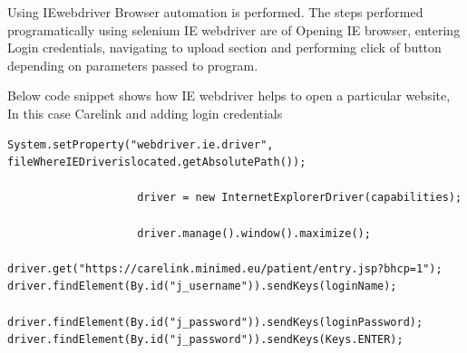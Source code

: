 \documentclass[article,type=msc,colorback,accentcolor=tud9c,twoside,11pt]{tudthesis}
\begin{document}
Using IEwebdriver Browser automation is performed. The steps performed programatically using selenium IE webdriver are of Opening IE browser, entering Login credentials, navigating to upload section and performing click of button depending on parameters passed to program.

Below code snippet shows how IE webdriver helps to open a particular website, In this case Carelink and adding login credentials
\begin{lstlisting}
System.setProperty("webdriver.ie.driver", fileWhereIEDriverislocated.getAbsolutePath());

					driver = new InternetExplorerDriver(capabilities);

					driver.manage().window().maximize();
					driver.get("https://carelink.minimed.eu/patient/entry.jsp?bhcp=1");
driver.findElement(By.id("j_username")).sendKeys(loginName);
				driver.findElement(By.id("j_password")).sendKeys(loginPassword);
driver.findElement(By.id("j_password")).sendKeys(Keys.ENTER);
\end{lstlisting}
\end{document}
